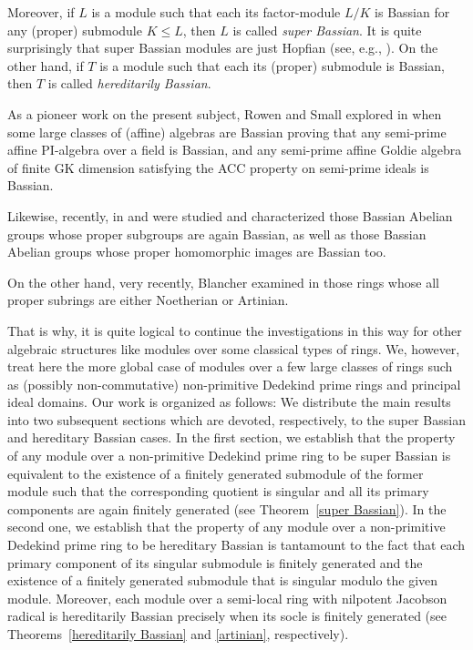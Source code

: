 \documentclass{amsart}
\theoremstyle{definition}
\begin{document}
Moreover, if $L$ is a module such that each its factor-module $L/K$ is Bassian for any (proper) submodule $K\leq L$, then $L$ is called {\it super Bassian}. It is quite surprisingly that super Bassian modules are just Hopfian (see, e.g., \cite[Proposition 3.6 (3)]{DKTZ}). On the other hand, if $T$ is a module such that each its (proper) submodule is Bassian, then $T$ is called {\it hereditarily Bassian}.

As a pioneer work on the present subject, Rowen and Small explored in \cite{RS} when some large classes of (affine) algebras are Bassian proving that any semi-prime affine PI-algebra over a field is Bassian, and any semi-prime affine Goldie algebra of finite GK dimension satisfying the ACC property on semi-prime ideals is Bassian.

Likewise, recently, in \cite{DG} and \cite{K} were studied and characterized those Bassian Abelian groups whose proper subgroups are again Bassian, as well as those Bassian Abelian groups whose proper homomorphic images are Bassian too.

On the other hand, very recently, Blancher examined in \cite{B} those rings whose all proper subrings are either Noetherian or Artinian.

That is why, it is quite logical to continue the investigations in this way for other algebraic structures like modules over some classical types of rings. We, however, treat here the more global case of modules over a few large classes of rings such as (possibly non-commutative) non-primitive Dedekind prime rings and principal ideal domains. Our work is organized as follows: We distribute the main results into two subsequent sections which are devoted, respectively, to the super Bassian and hereditary Bassian cases. In the first section, we establish that the property of any module over a non-primitive Dedekind prime ring to be super Bassian is equivalent to the existence of a finitely generated submodule of the former module such that the corresponding quotient is singular and all its primary components are again finitely generated (see Theorem~\ref{super Bassian}). In the second one, we establish that the property of any module over a non-primitive Dedekind prime ring to be hereditary Bassian is tantamount to the fact that each primary component of its singular submodule is finitely generated and the existence of a finitely generated submodule that is singular modulo the given module. Moreover, each module over a semi-local ring with nilpotent Jacobson radical is hereditarily Bassian precisely when its socle is finitely generated (see Theorems~\ref{hereditarily Bassian} and \ref{artinian}, respectively).
\end{document}
